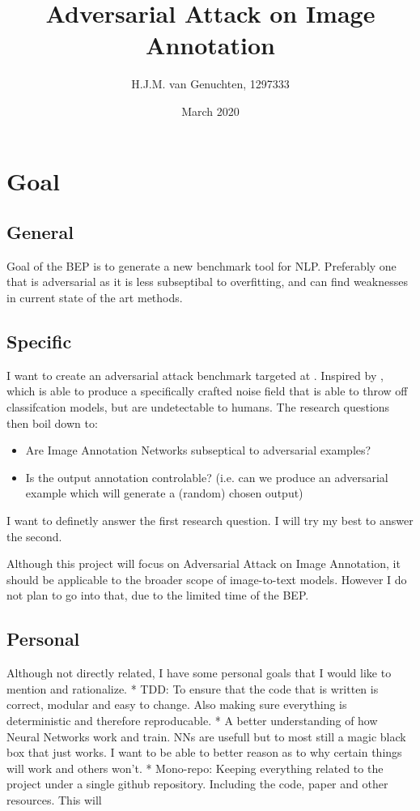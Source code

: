 \documentclass[12pt]{extarticle}
\title{Adversarial Attack on Image Annotation}
\author{H.J.M. van Genuchten, 1297333}
\date{March 2020}
\begin{document}
\maketitle

\section{ Goal}
\subsection{General}
Goal of the BEP is to generate a new benchmark tool for NLP. Preferably one that is adversarial as it is less subseptibal to overfitting, and can find weaknesses in current state of the art methods.

\subsection{Specific}
I want to create an adversarial attack benchmark targeted at \cite[image annotation]{venkatesh} . Inspired by \cite[Adversarial Examples]{goodfellow2015explaining}, which is able to produce a specifically crafted noise field that is able to throw off classifcation models, but are undetectable to humans. The research questions then boil down to:
\begin{itemize}
    \item Are Image Annotation Networks subseptical to adversarial examples?
    \item Is the output annotation controlable? (i.e. can we produce an adversarial example which will generate a (random) chosen output)
\end{itemize}

I want to definetly answer the first research question. I will try my best to answer the second.

Although this project will focus on Adversarial Attack on Image Annotation, it should be applicable to the broader scope of image-to-text models. However I do not plan to go into that, due to the limited time of the BEP.

\subsection{Personal}
Although not directly related, I have some personal goals that I would like to mention and rationalize.
* TDD: To ensure that the code that is written is correct, modular and easy to change. Also making sure everything is deterministic and therefore reproducable.
* A better understanding of how Neural Networks work and train. NNs are usefull but to most still a magic black box that just works. I want to be able to better reason as to why certain things will work and others won't.
* Mono-repo: Keeping everything related to the project under a single github repository. Including the code, paper and other resources. This will
\end{document}
